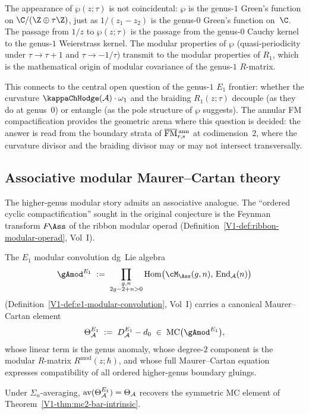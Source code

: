 \begin{remark}
\label{rem:wp-genus1-propagator}
The appearance of $\wp(z;\tau)$ is not coincidental: $\wp$ is the
genus-$1$ Green's function on $\C/(\Z \oplus \tau\Z)$, just as
$1/(z_1 - z_2)$ is the genus-$0$ Green's function on~$\C$. The
passage from $1/z$ to $\wp(z;\tau)$ is the passage from the
genus-$0$ Cauchy kernel to the genus-$1$ Weierstrass kernel.
The modular properties of $\wp$ (quasi-periodicity under
$\tau \to \tau + 1$ and $\tau \to -1/\tau$) transmit to the modular
properties of $R_1$, which is the mathematical origin of modular
covariance of the genus-$1$ $R$-matrix.

This connects to the central open question of the genus-$1$
$E_1$ frontier: whether the curvature $\kappaChHodge(\cA) \cdot \omega_1$
and the braiding $R_1(z;\tau)$ decouple (as they do at genus~$0$)
or entangle (as the pole structure of $\wp$ suggests). The
annular FM compactification provides the geometric arena where
this question is decided: the answer is read from the boundary
strata of $\overline{\mathrm{FM}}{}^{\,\mathrm{ann}}_{r,s}$ at
codimension~$2$, where the curvature divisor and the braiding
divisor may or may not intersect transversally.
\end{remark}

\subsection{Associative modular Maurer--Cartan theory}

The higher-genus modular story admits an associative analogue.
The ``ordered cyclic compactification'' sought in the original
conjecture is the Feynman transform $F\!\Ass$ of the ribbon modular
operad (Definition~\ref*{V1-def:ribbon-modular-operad}, Vol~I).

\begin{theorem}
\label{thm:modular}
The $E_1$ modular convolution dg~Lie algebra
\[
{\gAmod}^{E_1}
\;:=\;
\prod_{\substack{g,n \\ 2g-2+n>0}}
\operatorname{Hom}\bigl(
\cM_{\Ass}(g,n),\,\operatorname{End}_\cA(n)
\bigr)
\]
\textup{(}Definition~\textup{\ref*{V1-def:e1-modular-convolution}},
Vol~I\textup{)}
carries a canonical Maurer--Cartan element
\[
\Theta_\cA^{E_1}
\;:=\;
D_\cA^{E_1} - d_0
\;\in\;
\MC\bigl({\gAmod}^{E_1}\bigr),
\]
whose linear term is the genus anomaly, whose degree-$2$ component is
the modular $R$-matrix $R^{\mathrm{mod}}(z;\hbar)$, and whose full
Maurer--Cartan equation expresses compatibility of all ordered
higher-genus boundary gluings.

Under $\Sigma_n$-averaging\textup{,}
$\operatorname{av}(\Theta_{\mathcal{A}}^{E_1}) = \Theta_{\mathcal{A}}$
recovers the symmetric MC element of
Theorem~\textup{\ref*{V1-thm:mc2-bar-intrinsic}}.
\end{theorem}

